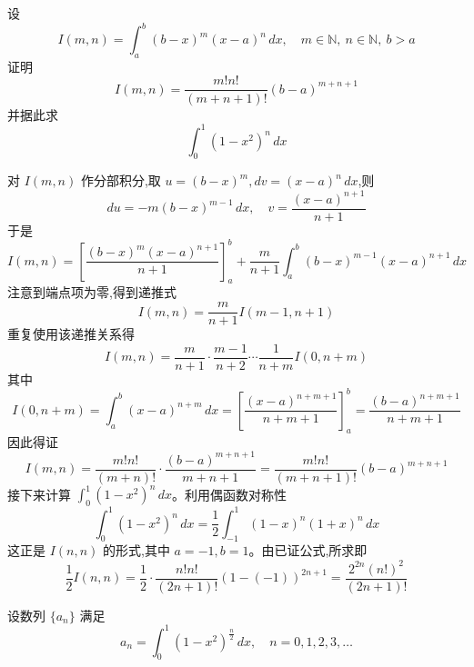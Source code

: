 \begin{questions}
    \question
    设
    \[
    I(m,n) = \int_{a}^{b} (b-x)^{m}(x-a)^{n} \, dx, \quad m \in \mathbb{N}, \ n \in \mathbb{N}, \ b > a
    \]
    证明
    \[
    I(m,n) = \frac{m!n!}{(m+n+1)!}(b-a)^{m+n+1}
    \]
    并据此求
    \[
    \int_{0}^{1} (1-x^2)^n \, dx
    \]
    \begin{solution}
        对 $I(m,n)$ 作分部积分,取 $u=(b-x)^m, dv=(x-a)^n \, dx$,则
        \[
        du = -m(b-x)^{m-1} \, dx, \quad v = \frac{(x-a)^{n+1}}{n+1}
        \]
        于是
        \[
        I(m,n) = \left[ \frac{(b-x)^m (x-a)^{n+1}}{n+1} \right]_a^b + \frac{m}{n+1} \int_a^b (b-x)^{m-1} (x-a)^{n+1} \, dx
        \]
        注意到端点项为零,得到递推式
        \[
        I(m,n) = \frac{m}{n+1} I(m-1, n+1)
        \]
        重复使用该递推关系得
        \[
        I(m,n) = \frac{m}{n+1} \cdot \frac{m-1}{n+2} \cdots \frac{1}{n+m} I(0, n+m)
        \]
        其中
        \[
        I(0, n+m) = \int_a^b (x-a)^{n+m} \, dx = \left[ \frac{(x-a)^{n+m+1}}{n+m+1} \right]_a^b = \frac{(b-a)^{n+m+1}}{n+m+1}
        \]
        因此得证
        \[
        I(m,n) = \frac{m! n!}{(m+n)!} \cdot \frac{(b-a)^{m+n+1}}{m+n+1} = \frac{m!n!}{(m+n+1)!}(b-a)^{m+n+1}
        \]
        接下来计算 $\int_0^1 (1-x^2)^n \, dx$。利用偶函数对称性
        \[
        \int_0^1 (1-x^2)^n \, dx = \frac{1}{2} \int_{-1}^1 (1-x)^n (1+x)^n \, dx
        \]
        这正是 $I(n,n)$ 的形式,其中 $a=-1, b=1$。由已证公式,所求即
        \[
        \frac{1}{2} I(n,n) = \frac{1}{2} \cdot \frac{n! n!}{(2n+1)!} (1 - (-1))^{2n+1} = \frac{2^{2n}(n!)^2}{(2n+1)!}
        \]
    \end{solution}

    \question 设数列 $\{a_n\}$ 满足
    \[
    a_n = \int_{0}^{1}(1-x^2)^{\frac{n}{2}}\,dx, \quad n=0, 1, 2, 3, \dots
    \]
\end{questions}
